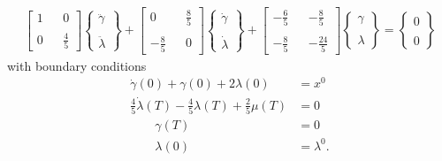 \documentclass[11pt]{article}
\begin{document}
\begin{equation*}
    \begin{aligned}
        \begin{bmatrix}
            1 & & 0 \\
            \\
            0 & & \frac{4}{5}
        \end{bmatrix}
        \begin{Bmatrix}
            \ddot{\gamma} \\
            \\
            \ddot{\lambda}
        \end{Bmatrix}
        + \begin{bmatrix}
            0 & & \frac{8}{5} \\
                 \\
           - \frac{8}{5} & & 0
          \end{bmatrix}
           \begin{Bmatrix}
            \dot{\gamma}\\
                 \\
            \dot{\lambda}
            \end{Bmatrix}   
        + \begin{bmatrix}
            - \frac{6}{5} & & - \frac{8}{5} \\
            \\
            - \frac{8}{5} & & - \frac{24}{5}
          \end{bmatrix}
          \begin{Bmatrix}
            \gamma\\
                 \\
            \lambda
            \end{Bmatrix}
            =
            \begin{Bmatrix}
                0\\
                 \\
                0
            \end{Bmatrix}
    \end{aligned}
\end{equation*}
with boundary conditions
\begin{equation*}
\begin{aligned}
   \dot{\gamma}(0) + \gamma(0) + 2 \lambda(0) & = x^0 \\
   \frac{4}{5} \dot{\lambda}(T) - \frac{4}{5} \lambda(T) + \frac{2}{5}\mu(T) & = 0 \\
         \qquad \gamma(T) & = 0 \\
         \qquad \lambda(0) & = \lambda^0. 
\end{aligned}
\end{equation*}
\end{document}
